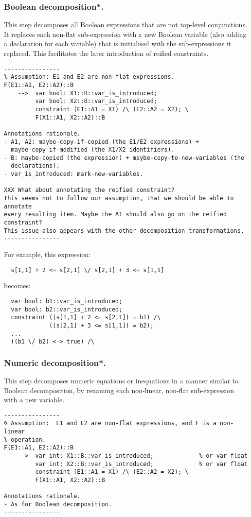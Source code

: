\documentclass[10pt]{article}
\begin{document}
\subsubsection{Boolean decomposition*.}
This step decomposes all Boolean expressions that are not top-level
conjunctions.  It replaces each non-flat sub-expression with a new Boolean
variable (also adding a declaration for each variable) that is initialised
with the sub-expressions it replaced.  This facilitates the later
introduction of reified constraints.

\begin{verbatim}
----------------
% Assumption: E1 and E2 are non-flat expressions.
F(E1::A1, E2::A2)::B
    -->  var bool: X1::B::var_is_introduced;
         var bool: X2::B::var_is_introduced;
         constraint (E1::A1 = X1) /\ (E2::A2 = X2); \
         F(X1::A1, X2::A2)::B

Annotations rationale.
- A1, A2: maybe-copy-if-copied (the E1/E2 expressions) +
  maybe-copy-if-modified (the X1/X2 identifiers).
- B: maybe-copied (the expression) + maybe-copy-to-new-variables (the
  declarations).
- var_is_introduced: mark-new-variables.

XXX What about annotating the reified constraint?
This seems not to follow our assumption, that we should be able to annotate
every resulting item. Maybe the A1 should also go on the reified constraint?
This issue also appears with the other decomposition transformations.
----------------
\end{verbatim}

For example, this expression:
\begin{verbatim}
  s[1,1] + 2 <= s[2,1] \/ s[2,1] + 3 <= s[1,1]
\end{verbatim}
becomes:
\begin{verbatim}
  var bool: b1::var_is_introduced;
  var bool: b2::var_is_introduced;
  constraint ((s[1,1] + 2 <= s[2,1]) = b1) /\
             ((s[2,1] + 3 <= s[1,1]) = b2);
  ...
  ((b1 \/ b2) <-> true) /\
\end{verbatim}


\subsubsection{Numeric decomposition*.}
This step decomposes numeric equations or inequations in a manner similar to
Boolean decomposition, by renaming each non-linear, non-flat sub-expression
with a new variable.

\begin{verbatim}
----------------
% Assumption:  E1 and E2 are non-flat expressions, and F is a non-linear
% operation.
F(E1::A1, E2::A2)::B
    -->  var int: X1::B::var_is_introduced;             % or var float
         var int: X2::B::var_is_introduced;             % or var float
         constraint (E1::A1 = X1) /\ (E2::A2 = X2); \
         F(X1::A1, X2::A2)::B

Annotations rationale.
- As for Boolean decomposition.
----------------
\end{verbatim}
\end{document}
